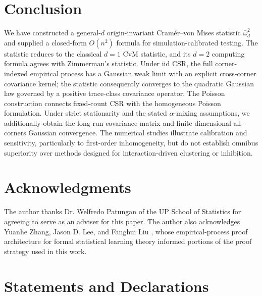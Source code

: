 \documentclass[pdflatex]{sn-jnl}
\theoremstyle{thmstyleone}
\theoremstyle{thmstyletwo}
\theoremstyle{thmstylethree}
\begin{document}
\section{Conclusion}\label{sec:conclusion}

We have constructed a general-$d$ origin-invariant Cram\'er--von Mises statistic $\bar\omega^2_d$ and supplied a closed-form $O(n^2)$ formula for simulation-calibrated testing. The statistic reduces to the classical $d=1$ CvM statistic, and its $d=2$ computing formula agrees with Zimmerman's statistic. Under iid CSR, the full corner-indexed empirical process has a Gaussian weak limit with an explicit cross-corner covariance kernel; the statistic consequently converges to the quadratic Gaussian law governed by a positive trace-class covariance operator. The Poisson construction connects fixed-count CSR with the homogeneous Poisson formulation. Under strict stationarity and the stated $\alpha$-mixing assumptions, we additionally obtain the long-run covariance matrix and finite-dimensional all-corners Gaussian convergence. The numerical studies illustrate calibration and sensitivity, particularly to first-order inhomogeneity, but do not establish omnibus superiority over methods designed for interaction-driven clustering or inhibition.

\backmatter

\section*{Acknowledgments}
The author thanks Dr. Welfredo Patungan of the UP School of Statistics for agreeing to serve as an adviser for this paper. The author also acknowledges Yuanhe Zhang, Jason D. Lee, and Fanghui Liu \cite{zhang2026aislt}, whose empirical-process proof architecture for formal statistical learning theory informed portions of the proof strategy used in this work.

\section*{Statements and Declarations}
\end{document}
